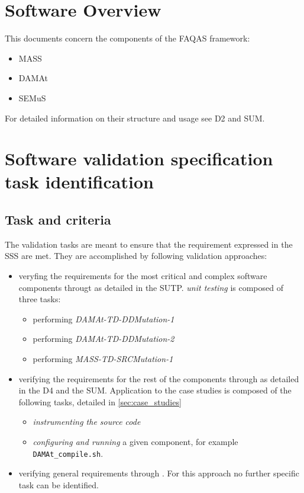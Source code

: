\chapter{Software Overview}

This documents concern the components of the FAQAS framework:
\begin{itemize}
  \item MASS
  \item DAMAt
  \item SEMuS
\end{itemize}

For detailed information on their structure and usage see D2 and SUM.

\chapter{Software validation specification task identification}

\section{Task and criteria}
\label{sec:taskCrit}

The validation tasks are meant to ensure that the requirement expressed in the SSS are met.
They are accomplished by following validation approaches:
\begin{itemize}
  \item veryfing the requirements for the most critical and complex software components througt  as detailed in the SUTP.
  \emph{unit testing} is composed of three tasks:
  \begin{itemize}
    \item performing \emph{DAMAt-TD-DDMutation-1}
    \item performing \emph{DAMAt-TD-DDMutation-2}
    \item performing \emph{MASS-TD-SRCMutation-1}
  \end{itemize}
  \item verifying the requirements for the rest of the components through  as detailed in the D4 and the SUM.
  Application to the case studies is composed of the following tasks, detailed in \ref{sec:case_studies}
  \begin{itemize}
    \item \emph{instrumenting the source code}
    \item \emph{configuring and running} a given component, for example \texttt{DAMAt\_compile.sh}.
  \end{itemize}
  \item verifying general requirements through . For this approach no further specific task can be identified.
\end{itemize}

